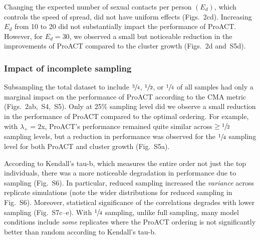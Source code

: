 \documentclass[a4paper,11pt]{article}
\newcommand{\PLWH}{sample\xspace}
\begin{document}
Changing the expected number of sexual contacts per person $\left(E_d\right)$, which controls the speed of spread, did not have uniform effects (Figs.~2cd). 
Increasing $E_d$ from 10 to 20 did not substantially impact the performance of ProACT. However, for $E_d=30$, we observed a small but noticeable reduction in the improvements of ProACT compared to the cluster growth (Figs.~2d and~S5d).




\subsubsection{Impact of incomplete sampling}
Subsampling the total dataset to include $\sfrac{3}{4}$, $\sfrac{1}{2}$, or $\sfrac{1}{4}$ of all \PLWH{s} had only a marginal impact on the performance of ProACT according to the CMA metric  (Figs.~2ab,~S4,~S5). 
Only at 25\% sampling level did we observe a small reduction in the performance of ProACT compared to the optimal ordering. 
For example, 
with $\lambda_{+}=2$x, ProACT's performance remained quite similar across $\geq \sfrac{1}{2}$ sampling levels, but a reduction in performance was observed for the $\sfrac{1}{4}$ sampling level for both ProACT and  cluster growth  (Fig.~S5a).


According to Kendall's tau-b, which measures the entire order not just the top individuals, there was a more noticeable degradation in performance due to sampling (Fig.~S6). 
In particular, reduced sampling increased the \textit{variance} across replicate simulations (note the wider distributions for reduced sampling in Fig.~S6).
Moreover, statistical significance of the correlations degrades with lower sampling (Fig.~S7c--e).
With  $\sfrac{1}{4}$ sampling, unlike full sampling, many model conditions include {\em some} replicates where the ProACT ordering is not significantly better than random according to Kendall's tau-b.
\end{document}
